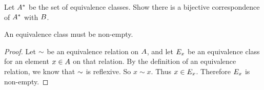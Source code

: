\documentclass[main.tex]{subfiles}
\begin{document}
\subproblem{}\label{s03p04b}

Let \({A^*}\) be the set of equivalence classes. Show there is a
bijective correspondence of \({A^*}\) with \({B}\).

\begin{thm}
	An equivalence class must be non-empty.
\end{thm}
\begin{proof}
	Let \({\sim}\) be an equivalence relation on \({A}\),
	and let \({E_x}\) be an equivalence class for an element
	\(x \in {A}\) on that relation. By the definition of an
	equivalence relation, we know that \({\sim}\) is reflexive.
	So \(x \sim x\). Thus \(x \in {E_x}\). Therefore \({E_x}\)
	is non-empty.
\end{proof}
\end{document}
